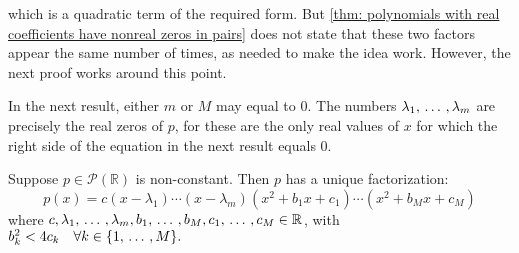 which is a quadratic term of the required form. But \ref{thm: polynomials with real coefficients have nonreal zeros in pairs} does not state that these two factors appear the same number of times, as needed to make the idea work. However, the next proof works around this point.

In the next result, either $m$ or $M$ may equal to $0$. The numbers $\lambda_1, {\, \ldots \,\,}, \lambda_m$ are precisely the real zeros of $p$, for these are the only real values of $x$ for which the right side of the equation in the next result equals 0.

\begin{thm}
  \label{thm: factorization of a polynomial over R}
  Suppose $p \in \mathcal{P}(\mathbb{R})$ is non-constant. Then $p$ has a unique factorization:
  \begin{equation}
    p(x) = c(x-\lambda_1) \cdots (x-\lambda_m)(x^2+b_1x+c_1) \cdots (x^2+b_Mx+c_M)
  \end{equation}
  where $c, \lambda_1, {\, \ldots \,\,}, \lambda_m, b_1, {\, \ldots \,\,}, b_M, c_1, {\, \ldots \,\,}, c_M \in \mathbb{R}$, with $b_k^2 < 4c_k \quad \forall k \in \{1, {\, \ldots \,\,}, M\}.$
\end{thm}
